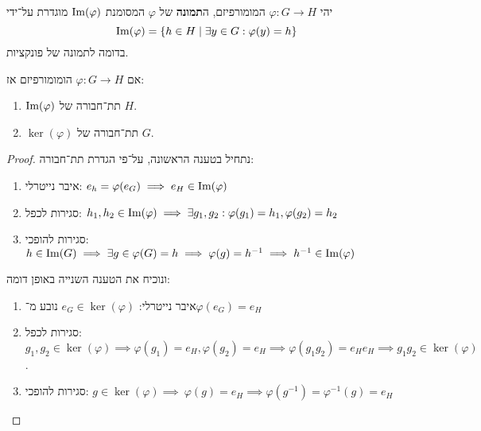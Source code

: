 \begin{definition}[תמונה]
	יהי $\varphi : G \to H$ המומורפיזם, ה\textbf{תמונה} של $\varphi$ המסומנת $\operatorname{Im}(\varphi)$ מוגדרת על־ידי
	\[
		\operatorname{Im}(\varphi) = \{ h \in H \mid \exists y \in G : \varphi(y) = h \}
	\]
	בדומה לתמונה של פונקציות.
\end{definition}

\begin{proposition}
	אם $\varphi : G \to H$ הומומורפיזם אז:
	\begin{enumerate}
		\item $\operatorname{Im}(\varphi)$ תת־חבורה של $H$.
		\item $\ker(\varphi)$ תת־חבורה של $G$.
	\end{enumerate}
\end{proposition}
\begin{proof}
	נתחיל בטענה הראשונה, על־פי הגדרת תת־חבורה:
	\begin{enumerate}
		\item איבר נייטרלי: $e_h = \varphi(e_G) \implies e_H \in \operatorname{Im}(\varphi)$
		\item סגירות לכפל: $h_1, h_2 \in \operatorname{Im}(\varphi) \implies \exists g_1, g_2 : \varphi(g_1) = h_1, \varphi(g_2) = h_2$
		\item סגירות להופכי: $h \in \operatorname{Im}(G) \implies \exists g \in \varphi(G) = h \implies \varphi(g) = h^{-1} \implies h^{-1} \in \operatorname{Im}(\varphi)$
	\end{enumerate}
	ונוכיח את הטענה השנייה באופן דומה:
	\begin{enumerate}
		\item איבר נייטרלי: $e_G \in \ker(\varphi)$ נובע מ־$\varphi(e_G) = e_H$
		\item סגירות לכפל: $ g_1, g_2 \in \ker(\varphi) \implies \varphi(g_1) = e_H, \varphi(g_2) = e_H \implies \varphi(g_1g_2) = e_H e_H \implies g_1g_2 \in \ker(\varphi)$.
		\item סגירות להופכי: $g \in \ker(\varphi) \implies\ \varphi(g) = e_H \implies \varphi(g^{-1}) = \varphi^{-1}(g) = e_H$
	\end{enumerate}
\end{proof}

